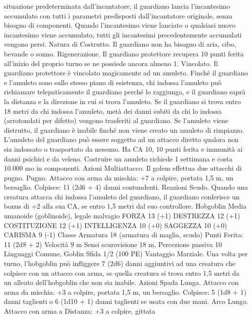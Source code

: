 \begin{multicols}{2}
situazione predeterminata dall’incantatore, il guardiano lancia
l’incantesimo accumulato con tutti i parametri predisposti
dall’incantatore originale, senza bisogno di componenti. Quando
l’incantesimo viene lanciato o qualsiasi nuovo incantesimo viene
accumulato, tutti gli incantesimi precedentemente accumulati
vengono persi.
Natura di Costrutto. Il guardiano non ha bisogno di aria, cibo,
bevande o sonno.
Rigenerazione. Il guardiano protettore recupera 10 punti ferita
all’inizio del proprio turno se ne possiede ancora almeno 1.
Vincolato. Il guardiano protettore è vincolato magicamente ad un
amuleto. Finché il guardiano e l’amuleto sono sullo stesso piano di
esistenza, chi indossa l’amuleto può richiamare telepaticamente il
guardiano perché lo raggiunga, e il guardiano saprà la distanza e la
direzione in cui si trova l’amuleto. Se il guardiano si trova entro 18
metri da chi indossa l’amuleto, metà dei danni subiti da chi lo
indossa (arrotondati per difetto) vengono trasferiti al guardiano. Se
l’amuleto viene distrutto, il guardiano è inabile finché non viene
creato un amuleto di rimpiazzo. L’amuleto del guardiano può essere
soggetto ad un attacco diretto qualora non sia indossato o trasportato
da nessuno. Ha CA 10, 10 punti ferita e immunità ai danni psichici e
da veleno. Costruire un amuleto richiede 1 settimana e costa 10.000
mo in componenti.
Azioni
Multiattacco. Il golem effettua due attacchi di pugno.
Pugno. Attacco con arma da mischia: +7 a colpire, portata 1,5
m, un bersaglio.
Colpisce: 11 (2d6 + 4) danni contundenti.
Reazioni
Scudo. Quando una creatura attacca chi indossa l’amuleto del
guardiano, il guardiano conferisce un bonus di +2 alla sua CA, se
entro 1,5 metri dal suo controllore.
Hobgoblin
Media umanoide (goblinoide), legale malvagio
FORZA 13 (+1)
DESTREZZA 12 (+1)
COSTITUZIONE 12 (+1)
INTELLIGENZA 10 (+0)
SAGGEZZA 10 (+0)
CARISMA 9 (-1)
Classe Armatura 18 (armatura di maglia, scudo)
\hspace*{0pt}\hfill{Punti Ferita}: 11 (2d8 + 2)
Velocità 9 m
Sensi scurovisione 18 m, Percezione passiva 10
Linguaggi Comune, Goblin
Sfida 1/2 (100 PE)
Vantaggio Marziale. Una volta per turno, l’hobgoblin può
infliggere 7 (2d6) danni aggiuntivi ad una creatura che colpisce
con un attacco con arma, se quella creatura si trova entro 1,5
metri da un alleato dell’hobgoblin che non sia inabile.
Azioni
Spada Lunga. Attacco con arma da mischia: +3 a colpire,
portata 1,5 m, un bersaglio.
Colpisce: 5 (1d8 + 1) danni taglienti o 6 (1d10 + 1) danni
taglienti se usata con due mani.
Arco Lungo. Attacco con arma a Distanza: +3 a colpire, gittata

\end{multicols}

